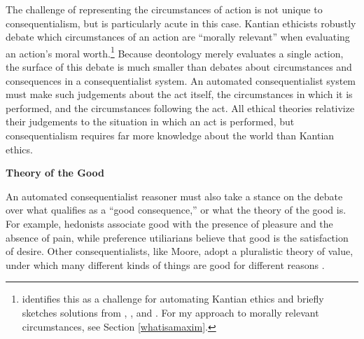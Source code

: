 \begin{isabellebody}
\begin{isamarkuptext}
The challenge of representing the circumstances of action is not unique to consequentialism, but is particularly acute in this case. 
Kantian ethicists robustly debate which circumstances of an action are ``morally relevant'' when evaluating an action's moral worth.\footnote{ 
\citet{powers} identifies this as a challenge for automating Kantian ethics and briefly sketches 
solutions from \citet{constofreason}, \citet{silber}, and \citet{rawlsconstructivism}. For my approach to
morally relevant circumstances, see Section \ref{whatisamaxim}.} Because deontology merely evaluates a 
single action, the surface of this debate is much smaller than debates about circumstances and 
consequences in a consequentialist system. An automated consequentialist system must make such 
judgements about the act itself, the circumstances in which it is performed, and the circumstances 
following the act. All ethical theories relativize their judgements to the situation in which an act 
is performed, but consequentialism requires far more knowledge about the world than Kantian ethics.%
\end{isamarkuptext}\isamarkuptrue%
%
\begin{isamarkuptext}%
\noindent \textbf{Theory of the Good}%
\end{isamarkuptext}\isamarkuptrue%
%
\begin{isamarkuptext}%
An automated consequentialist reasoner must also take a stance on the debate over
what qualifies as a ``good consequence,'' or what the theory of the good is. For example, hedonists associate
good with the presence of pleasure and the absence of pain, while preference utiliarians believe that good is 
the satisfaction of desire. Other consequentialists, like Moore, adopt a pluralistic theory of value, under which 
many different kinds of things are good for different reasons \citep{moorepe}. 


\end{isamarkuptext}
\end{isabellebody}
